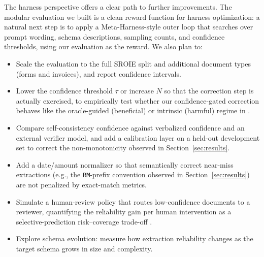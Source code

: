 \documentclass[conference]{IEEEtran}
\begin{document}
The harness perspective offers a clear path to further improvements. The modular evaluation we built is a clean reward function for harness optimization: a natural next step is to apply a Meta-Harness-style outer loop \cite{b2} that searches over prompt wording, schema descriptions, sampling counts, and confidence thresholds, using our evaluation as the reward. We also plan to:
\begin{itemize}
    \item Scale the evaluation to the full SROIE split and additional document types (forms and invoices), and report confidence intervals.
    \item Lower the confidence threshold \(\tau\) or increase \(N\) so that the correction step is actually exercised, to empirically test whether our confidence-gated correction behaves like the oracle-guided (beneficial) or intrinsic (harmful) regime in \cite{b3}.
    \item Compare self-consistency confidence against verbalized confidence and an external verifier model, and add a calibration layer on a held-out development set to correct the non-monotonicity observed in Section~\ref{sec:results}.
    \item Add a date/amount normalizer so that semantically correct near-miss extractions (e.g., the \texttt{RM}-prefix convention observed in Section~\ref{sec:results}) are not penalized by exact-match metrics.
    \item Simulate a human-review policy that routes low-confidence documents to a reviewer, quantifying the reliability gain per human intervention as a selective-prediction risk--coverage trade-off \cite{b16}.
    \item Explore schema evolution: measure how extraction reliability changes as the target schema grows in size and complexity.
\end{itemize}
\end{document}
